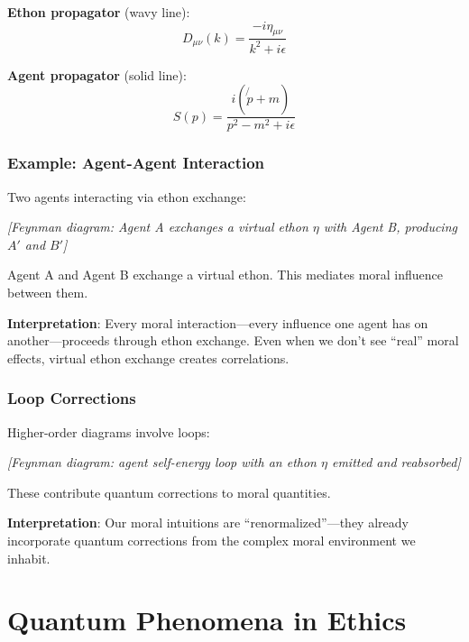 \documentclass[12pt]{article}
\begin{document}
\textbf{Ethon propagator} (wavy line):
\begin{equation}
    D_{\mu\nu}(k) = \frac{-i\eta_{\mu\nu}}{k^2 + i\epsilon}
\end{equation}

\textbf{Agent propagator} (solid line):
\begin{equation}
    S(p) = \frac{i(\not{p} + m)}{p^2 - m^2 + i\epsilon}
\end{equation}

\subsubsection{Example: Agent-Agent Interaction}

Two agents interacting via ethon exchange:

\begin{center}
\emph{[Feynman diagram: Agent A exchanges a virtual ethon $\eta$ with Agent B, producing $A'$ and $B'$]}
\end{center}

Agent A and Agent B exchange a virtual ethon. This mediates moral influence between them.

\textbf{Interpretation}: Every moral interaction---every influence one agent has on another---proceeds through ethon exchange. Even when we don't see ``real'' moral effects, virtual ethon exchange creates correlations.

\subsubsection{Loop Corrections}

Higher-order diagrams involve loops:

\begin{center}
\emph{[Feynman diagram: agent self-energy loop with an ethon $\eta$ emitted and reabsorbed]}
\end{center}

These contribute quantum corrections to moral quantities.

\textbf{Interpretation}: Our moral intuitions are ``renormalized''---they already incorporate quantum corrections from the complex moral environment we inhabit.

\section{Quantum Phenomena in Ethics}
\end{document}
